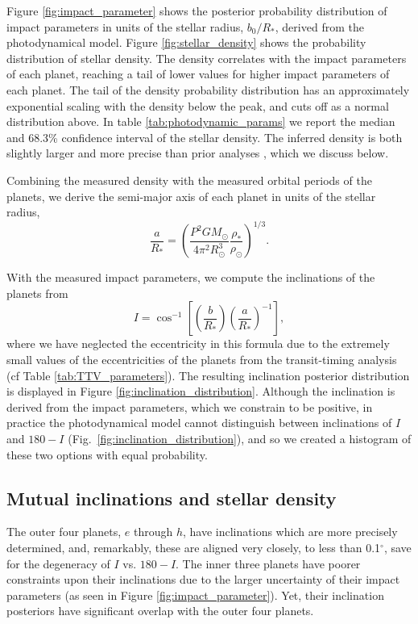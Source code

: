 \documentclass[fleqn,usenatbib]{mnras} %
\begin{document}
Figure \ref{fig:impact_parameter} shows the posterior probability distribution of impact
parameters in units of the stellar radius, $b_0/R_*$, derived from the photodynamical 
model.  Figure \ref{fig:stellar_density} shows the probability distribution of stellar 
density.  The density correlates with the impact
parameters of each planet, reaching a tail of lower values
for higher impact parameters of each planet.  The tail of the density probability
distribution has an approximately exponential scaling with the density below the
peak, and cuts off as a normal distribution above.  In table \ref{tab:photodynamic_params} 
we report the median and 68.3\% confidence interval
of the stellar density.  The inferred density is both slightly larger and more precise
than prior analyses \citep{Delrez2018a}, which we discuss below.

Combining the measured density with the measured orbital periods of the planets,
we derive the semi-major axis of each planet in units of the stellar radius,
\begin{equation}
    \frac{a}{R_*} = \left(\frac{P^2 G M_\odot}{4\pi^2 R_\odot^3} \frac{\rho_*}{\rho_\odot}\right)^{1/3}.
\end{equation}

With the measured impact parameters, we compute the inclinations of the planets
from
\begin{equation}
    I = \cos^{-1}\left[ \left(\frac{b}{R_*}\right)
    \left(\frac{a}{R_*}\right)^{-1}\right],
\end{equation}
where we have neglected the eccentricity in this formula due to the extremely
small values of the eccentricities of the planets from the transit-timing
analysis (cf Table \ref{tab:TTV_parameters}).  The resulting inclination
posterior distribution is displayed in Figure \ref{fig:inclination_distribution}.  
Although the inclination is derived from the impact parameters, which we constrain 
to be positive, in practice the photodynamical model cannot distinguish between 
inclinations of $I$ and $180-I$ (Fig.\ \ref{fig:inclination_distribution}), and so we created a histogram of these two options 
with equal probability.

\subsection{Mutual inclinations and stellar density}

The outer four planets, $e$ through $h$, have inclinations which are more
precisely determined, and, remarkably, these are aligned
very closely, to less than 0.1$^\circ$, save for the degeneracy of $I$ vs.
$180-I$.  The inner three planets have poorer
constraints upon their inclinations due to the larger uncertainty of their
impact parameters (as seen in Figure \ref{fig:impact_parameter}).  Yet, their inclination posteriors have significant overlap
with the outer four planets.
\end{document}
